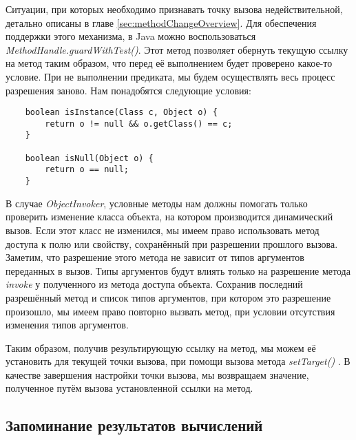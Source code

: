 Ситуации, при которых необходимо признавать точку вызова недействительной, детально описаны в главе \ref{sec:methodChangeOverview}. Для обеспечения поддержки этого механизма, в Java можно воспользоваться \textit{MethodHandle.guardWithTest()}. Этот метод позволяет обернуть текущую ссылку на метод таким образом, что перед её выполнением будет проверено какое-то условие. При не выполнении предиката, мы будем осуществлять весь процесс разрешения заново. Нам понадобятся следующие условия:

\begin{verbatim}
    boolean isInstance(Class c, Object o) {
        return o != null && o.getClass() == c;
    }

    boolean isNull(Object o) {
        return o == null;
    }
\end{verbatim} 

В случае \textit{ObjectInvoker}, условные методы нам должны помогать только проверить изменение класса объекта, на котором производится динамический вызов. Если этот класс не изменился, мы имеем право использовать метод доступа к полю или свойству, сохранённый при разрешении прошлого вызова. Заметим, что разрешение этого метода не зависит от типов аргументов переданных в вызов. Типы аргументов будут влиять только на разрешение метода \textit{invoke} у полученного из метода доступа объекта. Сохранив последний разрешённый метод и список типов аргументов, при котором это разрешение произошло, мы имеем право повторно вызвать метод, при условии отсутствия изменения типов аргументов.

Таким образом, получив результирующую ссылку на метод, мы можем её установить для текущей точки вызова, при помощи вызова метода 	\textit{setTarget()} \cite{javadoc:MutableCallSite}. В качестве завершения настройки точки вызова, мы возвращаем значение, полученное путём вызова установленной ссылки на метод.

\subsection{Запоминание результатов вычислений}

